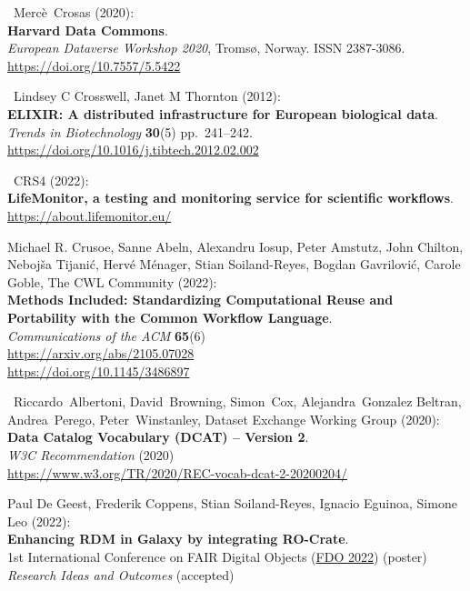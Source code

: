\begin{thebibliography}{9}
~Mercè~Crosas (2020):\\
\textbf{Harvard Data Commons}.\\
\emph{European Dataverse Workshop 2020}, Tromsø, Norway. ISSN
2387-3086.\\
\url{https://doi.org/10.7557/5.5422}

~Lindsey C Crosswell, Janet M Thornton (2012):\\
\textbf{ELIXIR: A distributed infrastructure for European biological
data}.\\
\emph{Trends in Biotechnology} \textbf{30}(5) pp.~241--242.\\
\url{https://doi.org/10.1016/j.tibtech.2012.02.002}

~CRS4 (2022):\\
\textbf{LifeMonitor, a testing and monitoring service for scientific
workflows}.\\
\url{https://about.lifemonitor.eu/}

 Michael R. Crusoe, Sanne Abeln, Alexandru Iosup, Peter
Amstutz, John Chilton, Nebojša Tijanić, Hervé Ménager, Stian
Soiland-Reyes, Bogdan Gavrilović, Carole Goble, The CWL Community
(2022):\\
\textbf{Methods Included: Standardizing
Computational Reuse and Portability with the Common Workflow
Language}.\\
\emph{Communications of the ACM} \textbf{65}(6)\\
\url{https://arxiv.org/abs/2105.07028}\\
\url{https://doi.org/10.1145/3486897}

~Riccardo~Albertoni, David~Browning, Simon~Cox,
Alejandra~Gonzalez Beltran, Andrea~Perego, Peter~Winstanley, Dataset
Exchange Working Group (2020):\\
\textbf{Data Catalog Vocabulary (DCAT) -- Version 2}.\\
\emph{W3C Recommendation} (2020)\\
\url{https://www.w3.org/TR/2020/REC-vocab-dcat-2-20200204/}


 Paul De Geest, Frederik Coppens, Stian
Soiland-Reyes, Ignacio Eguinoa, Simone Leo (2022):\\
\textbf{Enhancing RDM in Galaxy by integrating RO-Crate}.\\
1st International Conference on FAIR Digital Objects
(\href{https://www.fdo2022.org/}{FDO 2022}) (poster)\\
\emph{Research Ideas and Outcomes} (accepted)


\end{thebibliography}
